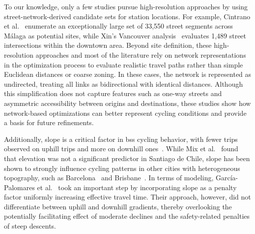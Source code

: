 To our knowledge, only a few studies pursue high-resolution approaches by using street-network-derived candidate sets for station locations. For example, Cintrano et al.~\cite{Cintrano2018} enumerate an exceptionally large set of 33,550 street segments across Málaga as potential sites, while Xin’s Vancouver analysis~\cite{Xin2013} evaluates 1,489 street intersections within the downtown area. Beyond site definition, these high-resolution approaches and most of the literature rely on network representations in the optimization process to evaluate realistic travel paths rather than simple Euclidean distances or coarse zoning. In these cases, the network is represented as undirected, treating all links as bidirectional with identical distances. Although this simplification does not capture features such as one-way streets and asymmetric accessibility between origins and destinations, these studies show how network-based optimizations can better represent cycling conditions and provide a basis for future refinements.

Additionally, slope is a critical factor in \ac{bss} cycling behavior, with fewer trips observed on uphill trips and more on downhill ones~\cite{Morency2015, Grau-Escolano2024, MateoBabiano2016}. While Mix et al.~\cite{Mix2022} found that elevation was not a significant predictor in Santiago de Chile, slope has been shown to strongly influence cycling patterns in other cities with heterogeneous topography, such as Barcelona~\cite{Grau-Escolano2024} and Brisbane~\cite{MateoBabiano2016}. In terms of modeling, García-Palomares et al.~\cite{GarciaPalomares2012} took an important step by incorporating slope as a penalty factor uniformly increasing effective travel time. Their approach, however, did not differentiate between uphill and downhill gradients, thereby overlooking the potentially facilitating effect of moderate declines and the safety-related penalties of steep descents.

